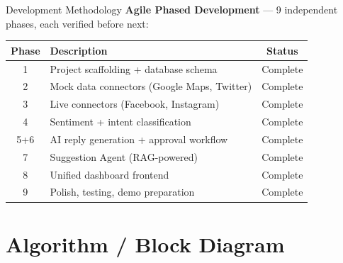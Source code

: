 \documentclass[aspectratio=169]{beamer}
\begin{document}
\begin{frame}{Development Methodology}
  \textbf{Agile Phased Development} — 9 independent phases, each verified before next:
  \vspace{0.2cm}
  \begin{table}
    \centering
    \small
    \begin{tabular}{@{}clc@{}}
      \toprule
      \textbf{Phase} & \textbf{Description} & \textbf{Status} \\
      \midrule
      1 & Project scaffolding + database schema & \textcolor{green!60!black}{Complete} \\
      2 & Mock data connectors (Google Maps, Twitter) & \textcolor{green!60!black}{Complete} \\
      3 & Live connectors (Facebook, Instagram) & \textcolor{green!60!black}{Complete} \\
      4 & Sentiment + intent classification & \textcolor{green!60!black}{Complete} \\
      5+6 & AI reply generation + approval workflow & \textcolor{green!60!black}{Complete} \\
      7 & Suggestion Agent (RAG-powered) & \textcolor{green!60!black}{Complete} \\
      8 & Unified dashboard frontend & \textcolor{green!60!black}{Complete} \\
      9 & Polish, testing, demo preparation & \textcolor{green!60!black}{Complete} \\
      \bottomrule
    \end{tabular}
  \end{table}
\end{frame}

\section{Algorithm / Block Diagram}
\end{document}
